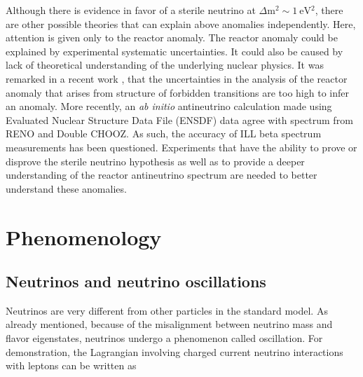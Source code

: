 \documentclass[11pt]{article}
\newcommand{\comment}[1]{}
\numberwithin{equation}{section}
\begin{document}
\comment{
In addition, data from the cosmic microwave background favors the existence of an additional degree of freedom which could be a sterile neutrino. The standard cosmological evolution model favors this neutrino to be $ \Delta \text{m}^{2} \sim 1~ \text{eV}{^2}$ .
}

Although there is evidence in favor of a sterile neutrino at $ \Delta \text{m}^{2} \sim 1~ \text{eV}{^2}$, there are other possible theories that can explain above anomalies independently. Here, attention is given only to the reactor anomaly. The reactor anomaly could be explained by experimental systematic uncertainties. It could also be caused by lack of theoretical understanding of the underlying nuclear physics. It was remarked in a recent work \cite{Hayes2013}, that the uncertainties in the analysis of the reactor anomaly that arises from structure of forbidden transitions are too high to infer an anomaly. More recently, an \textit{ab initio} antineutrino calculation \cite{DLSpectrum} made using Evaluated Nuclear Structure Data File (ENSDF) data \cite{ensdf2003online} agree with spectrum from  RENO and Double CHOOZ. As such, the accuracy of ILL beta spectrum measurements has been questioned. Experiments that have the ability to prove or disprove the sterile neutrino hypothesis as well as to provide a deeper understanding of the reactor antineutrino spectrum are needed to better understand these anomalies. 


\section[Phenomenology]{Phenomenology}

\subsection[Neutrinos and neutrino oscillations]{Neutrinos and neutrino oscillations}
Neutrinos are very different from other particles in the standard model. As already mentioned, because of the misalignment between neutrino mass and flavor eigenstates, neutrinos undergo a phenomenon called oscillation.
For demonstration, the Lagrangian involving charged current neutrino interactions with leptons can be written as 
\end{document}
